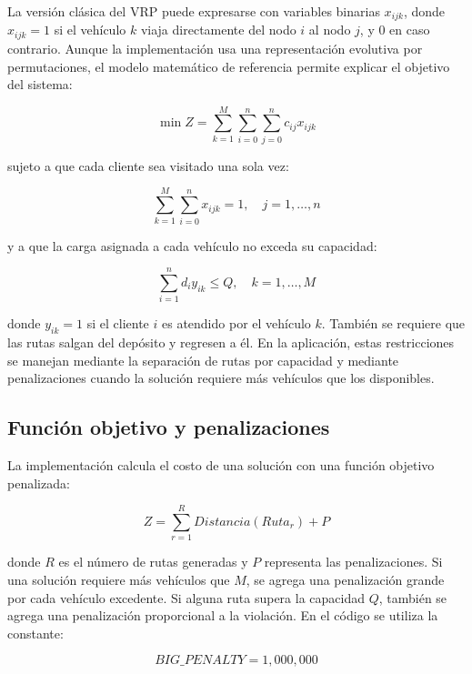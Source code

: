 \documentclass[runningheads]{llncs}
\begin{document}
La versi\'on cl\'asica del VRP puede expresarse con variables binarias $x_{ijk}$,
donde $x_{ijk}=1$ si el veh\'iculo $k$ viaja directamente del nodo $i$ al nodo
$j$, y $0$ en caso contrario. Aunque la implementaci\'on usa una representaci\'on
evolutiva por permutaciones, el modelo matem\'atico de referencia permite
explicar el objetivo del sistema:

\begin{equation}
\min Z = \sum_{k=1}^{M}\sum_{i=0}^{n}\sum_{j=0}^{n} c_{ij}x_{ijk}
\end{equation}

sujeto a que cada cliente sea visitado una sola vez:

\begin{equation}
\sum_{k=1}^{M}\sum_{i=0}^{n} x_{ijk} = 1, \quad j=1,\ldots,n
\end{equation}

y a que la carga asignada a cada veh\'iculo no exceda su capacidad:

\begin{equation}
\sum_{i=1}^{n} d_i y_{ik} \leq Q, \quad k=1,\ldots,M
\end{equation}

donde $y_{ik}=1$ si el cliente $i$ es atendido por el veh\'iculo $k$. Tambi\'en se
requiere que las rutas salgan del dep\'osito y regresen a \'el. En la aplicaci\'on,
estas restricciones se manejan mediante la separaci\'on de rutas por capacidad y
mediante penalizaciones cuando la soluci\'on requiere m\'as veh\'iculos que los
disponibles.

\subsection{Funci\'on objetivo y penalizaciones}

La implementaci\'on calcula el costo de una soluci\'on con una funci\'on objetivo
penalizada:

\begin{equation}
Z = \sum_{r=1}^{R} Distancia(Ruta_r) + P
\end{equation}

donde $R$ es el n\'umero de rutas generadas y $P$ representa las penalizaciones.
Si una soluci\'on requiere m\'as veh\'iculos que $M$, se agrega una penalizaci\'on
grande por cada veh\'iculo excedente. Si alguna ruta supera la capacidad $Q$,
tambi\'en se agrega una penalizaci\'on proporcional a la violaci\'on. En el c\'odigo
se utiliza la constante:

\begin{equation}
BIG\_PENALTY = 1,000,000
\end{equation}
\end{document}
